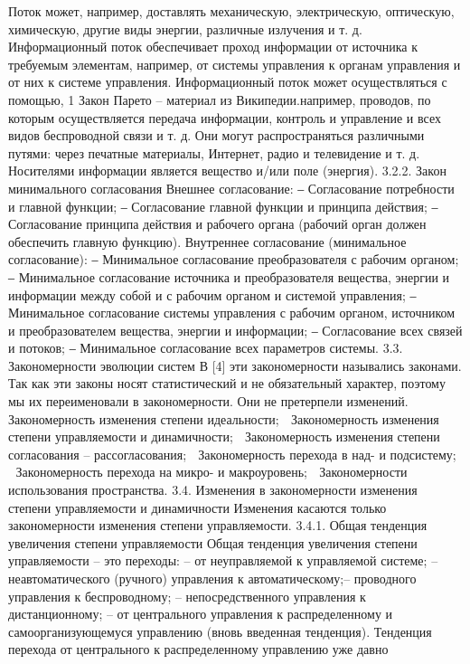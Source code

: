 \documentclass[11pt,a4paper]{article}
\begin{document}
\begin{itemize}
Поток может, например, доставлять механическую, электрическую, оптическую,
химическую, другие виды энергии, различные излучения и т. д.
Информационный поток обеспечивает проход информации от источника к
требуемым элементам, например, от системы управления к органам управления и от них к
системе управления. Информационный поток может осуществляться с помощью,
1
Закон Парето – материал из Википедии.например, проводов, по которым осуществляется передача информации, контроль и
управление и всех видов беспроводной связи и т. д. Они могут распространяться
различными путями: через печатные материалы, Интернет, радио и телевидение и т. д.
Носителями информации является вещество и/или поле (энергия).
3.2.2. Закон минимального согласования
Внешнее согласование:
‒ Согласование потребности и главной функции;
‒ Согласование главной функции и принципа действия;
‒ Согласование принципа действия и рабочего органа (рабочий орган должен
обеспечить главную функцию).
Внутреннее согласование (минимальное согласование):
‒ Минимальное согласование преобразователя с рабочим органом;
‒ Минимальное согласование источника и преобразователя вещества, энергии и
информации между собой и с рабочим органом и системой управления;
‒ Минимальное согласование системы управления с рабочим органом,
источником и преобразователем вещества, энергии и информации;
‒ Согласование всех связей и потоков;
‒ Минимальное согласование всех параметров системы.
3.3. Закономерности эволюции систем
В [4] эти закономерности назывались законами. Так как эти законы носят
статистический и не обязательный характер, поэтому мы их переименовали в
закономерности. Они не претерпели изменений.
 Закономерность изменения степени идеальности;
 Закономерность изменения степени управляемости и динамичности;
 Закономерность изменения степени согласования – рассогласования;
 Закономерность перехода в над- и подсистему;
 Закономерность перехода на микро- и макроуровень;
 Закономерности использования пространства.
3.4. Изменения в закономерности изменения степени управляемости и
динамичности
Изменения касаются только закономерности изменения степени управляемости.
3.4.1. Общая тенденция увеличения степени управляемости
Общая тенденция увеличения степени управляемости – это переходы:
– от неуправляемой к управляемой системе;
– неавтоматического (ручного) управления к автоматическому;– проводного управления к беспроводному;
– непосредственного управления к дистанционному;
– от центрального управления к распределенному и самоорганизующемуся
управлению (вновь введенная тенденция).
Тенденция перехода от центрального к распределенному управлению уже давно

\end{itemize}
\end{document}
